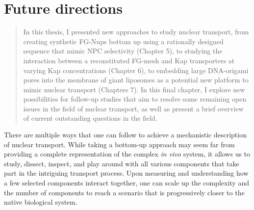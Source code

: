 \chapter{Future directions}
\label{chapter_8}


%
%

\begin{abstract}
	In this thesis, I presented new approaches to study nuclear transport, from creating synthetic FG-Nups bottom up using a rationally designed sequence that mimic NPC selectivity (Chapter 5), to studying the interaction between a reconstituted FG-mesh and Kap transporters at varying Kap concentrations (Chapter 6), to embedding large DNA-origami pores into the membrane of giant liposomes as a potential new platform to mimic nuclear transport (Chapters 7). In this final chapter, I explore new possibilities for follow-up studies that aim to resolve some remaining open issues in the field of nuclear transport, as well as present a brief overview of current outstanding questions in the field.
\end{abstract}
\newpage

\noindent There are  multiple ways that one can follow to achieve a  mechanistic description of nuclear transport. While taking a bottom-up approach may seem far from providing a complete representation of the complex \emph{in vivo} system, it allows us to study, dissect, inspect, and play around with all various components that take part in the intriguing transport process. Upon measuring and understanding how a few selected  components interact together, one can scale up the complexity and the number of components to reach a scenario that is progressively closer to the native biological system.

